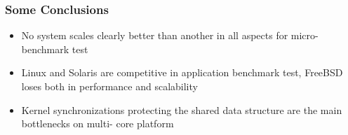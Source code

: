 \begin{frame}[plain]	
	\frametitle{Some Conclusions}
	
	\begin{itemize}\Large
		\item No system scales clearly better than another in
		all aspects for micro-benchmark test
		\item Linux and Solaris are competitive in application
		benchmark test, FreeBSD loses both in
		performance and scalability
		\item Kernel synchronizations protecting the shared
		data structure are the main bottlenecks on multi-
		core platform
		
	\end{itemize}	
	
\end{frame}
